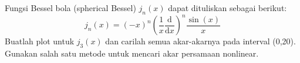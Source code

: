 \begin{soal}
Fungsi Bessel bola (spherical Bessel) $j_{n}(x)$ dapat dituliskan sebagai
berikut:
\begin{equation*}
j_{n}(x) = (-x)^{n}
\left( \frac{1}{x} \frac{\mathrm{d}}{\mathrm{d}x} \right)^n
\frac{\sin(x)}{x}
\end{equation*}
Buatlah plot untuk $j_{3}(x)$ dan carilah semua akar-akarnya pada interval (0,20).
Gunakan salah satu metode untuk mencari akar persamaan nonlinear.
\end{soal}